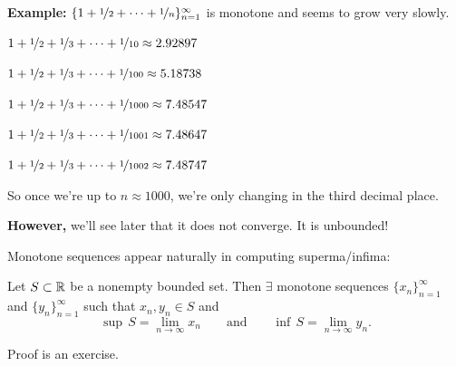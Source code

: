 \documentclass[10pt,aspectratio=169]{beamer}
\begin{document}
\begin{frame}
\textbf{Example:}
$\{ 1 + \nicefrac{1}{2} + \cdots + \nicefrac{1}{n} \}_{n=1}^\infty$ is monotone and seems to grow very
slowly.

\medskip
\pause

$1 + \nicefrac{1}{2} + \nicefrac{1}{3} + \cdots + \nicefrac{1}{10} \approx
2.92897$

\medskip
\pause

$1 + \nicefrac{1}{2} + \nicefrac{1}{3} + \cdots + \nicefrac{1}{100} \approx
5.18738$

\medskip
\pause

$1 + \nicefrac{1}{2} + \nicefrac{1}{3} + \cdots + \nicefrac{1}{1000} \approx
7.48547$

\medskip
\pause

$1 + \nicefrac{1}{2} + \nicefrac{1}{3} + \cdots + \nicefrac{1}{1001} \approx
7.48647$

\medskip
\pause

$1 + \nicefrac{1}{2} + \nicefrac{1}{3} + \cdots + \nicefrac{1}{1002} \approx
7.48747$

\medskip
\pause

So once we're up to $n \approx 1000$, we're only changing in the third
decimal place.

\medskip
\pause

\textbf{However,}
we'll see later that it does not converge.  It is unbounded!

\end{frame}

\begin{frame}
Monotone sequences appear naturally in computing superma/infima:

\pause

\begin{proposition}
Let $S \subset {\mathbb{R}}$ be a nonempty bounded set.
\pause
Then $\exists$ monotone sequences
$\{ x_n \}_{n=1}^\infty$ and $\{ y_n \}_{n=1}^\infty$ such that $x_n, y_n \in S$ and
\begin{equation*}
\sup\,S = \lim_{n\to \infty} x_n \qquad \text{and} \qquad \inf\,S =
\lim_{n\to\infty} y_n .
\end{equation*}
\end{proposition}

\pause

Proof is an exercise.
\end{frame}
\end{document}
